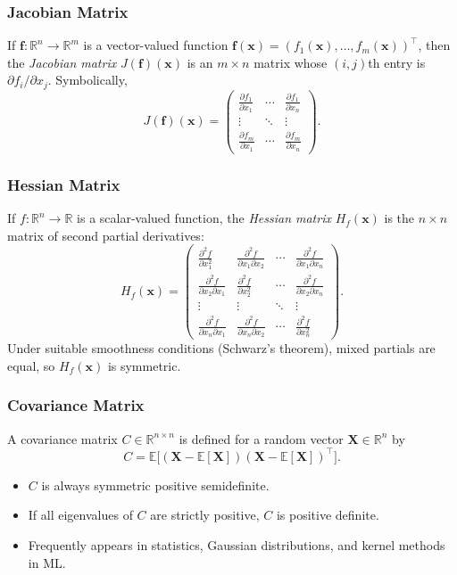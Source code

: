 \begin{itemize}
\subsubsection{Jacobian Matrix}
If $\mathbf{f}: \mathbb{R}^n \to \mathbb{R}^m$ is a vector-valued function 
$\mathbf{f}(\mathbf{x}) = (f_1(\mathbf{x}),\ldots,f_m(\mathbf{x}))^\top$, 
then the \emph{Jacobian matrix} $J(\mathbf{f})(\mathbf{x})$ is an $m \times n$ matrix whose 
$(i,j)$th entry is $\partial f_i/\partial x_j$. Symbolically,
\[
J(\mathbf{f})(\mathbf{x}) 
= \begin{pmatrix}
\frac{\partial f_1}{\partial x_1} & \cdots & \frac{\partial f_1}{\partial x_n} \\
\vdots & \ddots & \vdots \\
\frac{\partial f_m}{\partial x_1} & \cdots & \frac{\partial f_m}{\partial x_n}
\end{pmatrix}.
\]

\subsubsection{Hessian Matrix}
If $f: \mathbb{R}^n \to \mathbb{R}$ is a scalar-valued function, the \emph{Hessian matrix} 
$H_f(\mathbf{x})$ is the $n \times n$ matrix of second partial derivatives:
\[
H_f(\mathbf{x}) = 
\begin{pmatrix}
\frac{\partial^2 f}{\partial x_1^2} & \frac{\partial^2 f}{\partial x_1 \partial x_2} & \cdots & \frac{\partial^2 f}{\partial x_1 \partial x_n} \\
\frac{\partial^2 f}{\partial x_2 \partial x_1} & \frac{\partial^2 f}{\partial x_2^2} & \cdots & \frac{\partial^2 f}{\partial x_2 \partial x_n} \\
\vdots & \vdots & \ddots & \vdots \\
\frac{\partial^2 f}{\partial x_n \partial x_1} & \frac{\partial^2 f}{\partial x_n \partial x_2} & \cdots & \frac{\partial^2 f}{\partial x_n^2}
\end{pmatrix}.
\]
Under suitable smoothness conditions (Schwarz's theorem), mixed partials are equal, 
so $H_f(\mathbf{x})$ is symmetric.

\subsubsection{Covariance Matrix}
A covariance matrix $C \in \mathbb{R}^{n \times n}$ is defined for a random vector 
$\mathbf{X} \in \mathbb{R}^n$ by
\[
C = \mathbb{E}\bigl[(\mathbf{X} - \mathbb{E}[\mathbf{X}])(\mathbf{X} - \mathbb{E}[\mathbf{X}])^\top\bigr].
\]
\begin{itemize}
    \item $C$ is always symmetric positive semidefinite.
    \item If all eigenvalues of $C$ are strictly positive, $C$ is positive definite.
    \item Frequently appears in statistics, Gaussian distributions, and kernel methods in ML.
\end{itemize}


\end{itemize}
